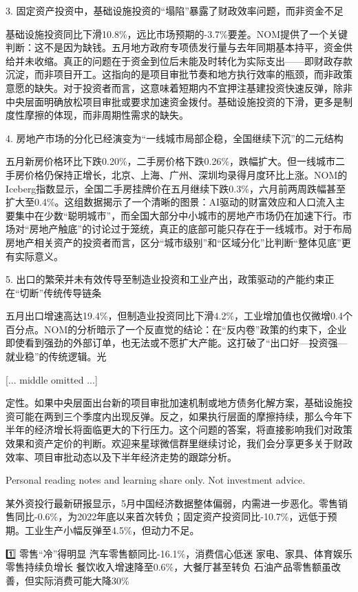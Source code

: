 \documentclass[11pt]{ctexart}
\begin{document}
3. 固定资产投资中，基础设施投资的“塌陷”暴露了财政效率问题，而非资金不足

基础设施投资同比下滑10.8\%，远比市场预期的-3.7\%要差。NOM提供了一个关键判断：这不是因为缺钱。五月地方政府专项债发行量与去年同期基本持平，资金供给并未收缩。真正的问题在于资金到位后未能及时转化为实际支出——即财政存款沉淀，而非项目开工。这指向的是项目审批节奏和地方执行效率的瓶颈，而非政策意愿的缺失。对于投资者而言，这意味着短期内不宜押注基建投资快速反弹，除非中央层面明确放松项目审批或要求加速资金拨付。基础设施投资的下滑，更多是制度性摩擦的体现，而非周期性需求的缺失。

4. 房地产市场的分化已经演变为“一线城市局部企稳，全国继续下沉”的二元结构

五月新房价格环比下跌0.20\%，二手房价格下跌0.26\%，跌幅扩大。但一线城市二手房价格仍保持正增长，北京、上海、广州、深圳均录得月度环比上涨。NOM的Iceberg指数显示，全国二手房挂牌价在五月继续下跌0.3\%，六月前两周跌幅甚至扩大至0.4\%。这组数据揭示了一个清晰的图景：AI驱动的财富效应和人口流入主要集中在少数“聪明城市”，而全国大部分中小城市的房地产市场仍在加速下行。市场对“房地产触底”的讨论过于笼统，真正的底部可能只存在于一线城市。对于布局房地产相关资产的投资者而言，区分“城市级别”和“区域分化”比判断“整体见底”更有实际意义。

5. 出口的繁荣并未有效传导至制造业投资和工业产出，政策驱动的产能约束正在“切断”传统传导链条

五月出口增速高达19.4\%，但制造业投资同比下滑4.2\%，工业增加值也仅微增0.4个百分点。NOM的分析暗示了一个反直觉的结论：在“反内卷”政策的约束下，企业即使看到强劲的外部订单，也无法或不愿扩大产能。这打破了“出口好—投资强—就业稳”的传统逻辑。光

[... middle omitted ...]

定性。如果中央层面出台新的项目审批加速机制或地方债务化解方案，基础设施投资可能在两到三个季度内出现反弹。反之，如果执行层面的摩擦持续，那么今年下半年的经济增长将面临更大的下行压力。这个问题的答案，将直接影响我们对政策效果和资产定价的判断。欢迎来星球微信群里继续讨论，我们会分享更多关于财政效率、项目审批动态以及下半年经济走势的跟踪分析。

Personal reading notes and learning share only. Not investment advice.

某外资投行最新研报显示，5月中国经济数据整体偏弱，内需进一步恶化。零售销售同比-0.6\%，为2022年底以来首次转负；固定资产投资同比-10.7\%，远低于预期。工业生产小幅反弹至4.5\%，但动力不足。

1️⃣ 零售“冷”得明显 汽车零售额同比-16.1\%，消费信心低迷 家电、家具、体育娱乐零售持续负增长 餐饮收入增速降至0.6\%，大餐厅甚至转负 石油产品零售额虽改善，但实际消费可能大降30\%
\end{document}
